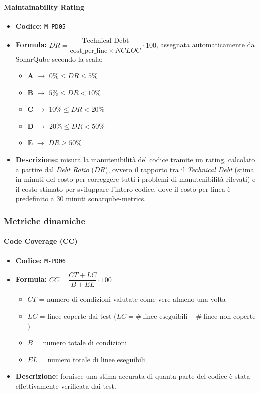 \documentclass[a4paper,12pt]{article}
\begin{document}
\paragraph{Maintainability Rating}
\begin{itemize}
\item \textbf{Codice:} \texttt{M-PD05}
\item \textbf{Formula:} $DR = \dfrac{\text{Technical Debt}}{\text{cost\_per\_line} 
\times NCLOC} \cdot 100$, assegnata automaticamente da SonarQube secondo la scala:
\begin{itemize}
    \item \textbf{A} $\rightarrow$ $0\% \leq DR \leq 5\%$
    \item \textbf{B} $\rightarrow$ $5\% \leq DR < 10\%$
    \item \textbf{C} $\rightarrow$ $10\% \leq DR < 20\%$
    \item \textbf{D} $\rightarrow$ $20\% \leq DR < 50\%$
    \item \textbf{E} $\rightarrow$ $DR \geq 50\%$
\end{itemize}
\item \textbf{Descrizione:} misura la manutenibilità del codice tramite un rating, calcolato a partire dal 
\textit{Debt Ratio} ($DR$), ovvero il rapporto tra il \textit{Technical Debt} 
(stima in minuti del costo per correggere tutti i problemi di manutenibilità 
rilevati) e il costo stimato per sviluppare l'intero codice, dove il costo per 
linea è predefinito a 30 minuti sonarqube-metrics.
\end{itemize}

\subsubsection{Metriche dinamiche}
\paragraph{Code Coverage (CC)}
\begin{itemize}
\item \textbf{Codice:} \texttt{M-PD06}
\item \textbf{Formula:} 
$CC = \dfrac{CT + LC}{B + EL} \cdot 100$
\begin{itemize}
    \item \textbf{$CT$} = numero di condizioni valutate come vere almeno una volta
    \item \textbf{$LC$} = linee coperte dai test 
    ($LC = \#\ \text{linee eseguibili} - \#\ \text{linee non coperte}$)
    \item \textbf{$B$} = numero totale di condizioni
    \item \textbf{$EL$} = numero totale di linee eseguibili
\end{itemize}
\item \textbf{Descrizione:} fornisce una stima accurata di quanta parte 
del codice è stata effettivamente verificata dai test.
\end{itemize}
\end{document}
